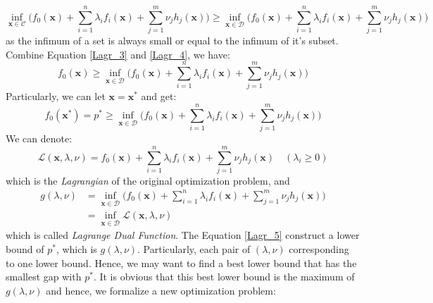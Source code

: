 \documentclass[10pt,a4paper]{article}
\begin{document}
\begin{equation}
	\displaystyle\inf_{\mathbf{x} \in \mathcal{C}} \Big( f_{0}(\mathbf{x}) + \displaystyle\sum_{i = 1}^{n}\lambda_{i} f_{i}(\mathbf{x}) + \displaystyle\sum_{j  = 1}^{m} \nu_{j} h_{j}(\mathbf{x}) \Big) \geq \displaystyle\inf_{\mathbf{x} \in \mathcal{D}} \Big( f_{0}(\mathbf{x}) + \displaystyle\sum_{i = 1}^{n}\lambda_{i} f_{i}(\mathbf{x}) + \displaystyle\sum_{j  = 1}^{m} \nu_{j} h_{j}(\mathbf{x}) \Big)
	\label{Lagr_4}
\end{equation}
as the infimum of a set is always small or equal to the infimum of it's subset. Combine Equation \ref{Lagr_3} and \ref{Lagr_4}, we have:
\begin{equation}
	f_{0}(\mathbf{x}) \geq \displaystyle\inf_{\mathbf{x} \in \mathcal{D}} \Big( f_{0}(\mathbf{x}) + \displaystyle\sum_{i = 1}^{n}\lambda_{i} f_{i}(\mathbf{x}) + \displaystyle\sum_{j  = 1}^{m} \nu_{j} h_{j}(\mathbf{x}) \Big)
\end{equation}
Particularly, we can let $\mathbf{x} = \mathbf{x}^{*}$ and get:
\begin{equation}
	f_{0}(\mathbf{x}^{*}) = p^{*} \geq \displaystyle\inf_{\mathbf{x} \in \mathcal{D}} \Big( f_{0}(\mathbf{x}) + \displaystyle\sum_{i = 1}^{n}\lambda_{i} f_{i}(\mathbf{x}) + \displaystyle\sum_{j  = 1}^{m} \nu_{j} h_{j}(\mathbf{x}) \Big)
	\label{Lagr_5}
\end{equation}
We can denote:
\begin{equation}
	\mathcal{L}(\mathbf{x}, \lambda, \nu) = f_{0}(\mathbf{x}) + \displaystyle\sum_{i = 1}^{n}\lambda_{i} f_{i}(\mathbf{x}) + \displaystyle\sum_{j  = 1}^{m} \nu_{j} h_{j}(\mathbf{x}) \quad (\lambda_{i} \geq 0)
\end{equation}
which is the \textit{Lagrangian} of the original optimization problem, and
\begin{equation}
	\begin{aligned}
		g(\lambda, \nu) &= \displaystyle\inf_{\mathbf{x} \in \mathcal{D}} \Big( f_{0}(\mathbf{x}) + \displaystyle\sum_{i = 1}^{n}\lambda_{i} f_{i}(\mathbf{x}) + \displaystyle\sum_{j  = 1}^{m} \nu_{j} h_{j}(\mathbf{x}) \Big) \\
		&= \displaystyle\inf_{\mathbf{x} \in \mathcal{D}}\mathcal{L}(\mathbf{x}, \lambda, \nu)
	\end{aligned}
	\label{Lagr_6}
\end{equation}
which is called \textit{Lagrange Dual Function}. The Equation \ref{Lagr_5} construct a lower bound of $p^{*}$, which is $g(\lambda, \nu)$. Particularly, each pair of $(\lambda, \nu)$ corresponding to one lower bound. Hence, we may want to find a best lower bound that has the smallest gap with $p^{*}$. It is obvious that this best lower bound is the maximum of $g(\lambda, \nu)$ and hence, we formalize a new optimization problem:
\end{document}
